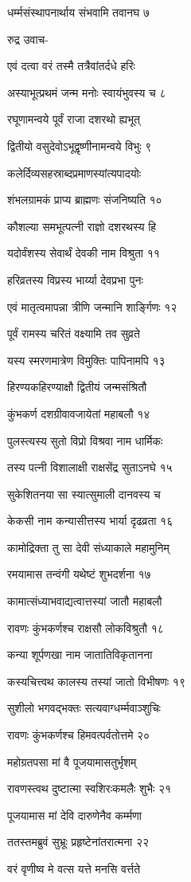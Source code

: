 धर्म्मसंस्थापनार्थाय संभवामि तवानघ ७

रुद्र उवाच-

एवं दत्वा वरं तस्मै तत्रैवांतर्दधे हरिः

अस्याभूत्प्रथमं जन्म मनोः स्वायंभुवस्य च ८

रघूणामन्वये पूर्वं राजा दशरथो ह्यभूत्

द्वितीयो वसुदेवोऽभूद्वृष्णीनामन्वये विभुः ९

कलेर्दिव्यसहस्राब्दप्रमाणस्यांत्यपादयोः

शंभलग्रामकं प्राप्य ब्राह्मणः संजनिष्यति १०

कौशल्या समभूत्पत्नी राज्ञो दशरथस्य हि

यदोर्वंशस्य सेवार्थं देवकी नाम विश्रुता ११

हरिव्रतस्य विप्रस्य भार्य्या देवप्रभा पुनः

एवं मातृत्वमापन्ना त्रीणि जन्मानि शार्ङ्गिणः १२

पूर्वं रामस्य चरितं वक्ष्यामि तव सुव्रते

यस्य स्मरणमात्रेण विमुक्तिः पापिनामपि १३

हिरण्यकहिरण्याक्षौ द्वितीयं जन्मसंश्रितौ

कुंभकर्ण दशग्रीवावजायेतां महाबलौ १४

पुलस्त्यस्य सुतो विप्रो विश्रवा नाम धार्मिकः

तस्य पत्नी विशालाक्षी राक्षसेंद्र सुताऽनघे १५

सुकेशितनया सा स्यात्सुमाली दानवस्य च

केकसी नाम कन्यासीत्तस्य भार्या दृढव्रता १६

कामोद्रिक्ता तु सा देवी संध्याकाले महामुनिम्

रमयामास तन्वंगी यथेष्टं शुभदर्शना १७

कामात्संध्याभवाद्यत्वात्तस्यां जातौ महाबलौ

रावणः कुंभकर्णश्च राक्षसौ लोकविश्रुतौ १८

कन्या शूर्पणखा नाम जातातिविकृतानना

कस्यचित्त्वथ कालस्य तस्यां जातो विभीषणः १९

सुशीलो भगवद्भक्तः सत्यवाग्धर्म्मवाञ्शुचिः

रावणः कुंभकर्णश्च हिमवत्पर्वतोत्तमे २०

महोग्रतपसा मां वै पूजयामासतुर्भृशम्

रावणस्त्वथ दुष्टात्मा स्वशिरःकमलैः शुभैः २१

पूजयामास मां देवि दारुणेनैव कर्म्मणा

ततस्तमब्रुवं सुभ्रूः प्रहृष्टेनांतरात्मना २२

वरं वृणीष्व मे वत्स यत्ते मनसि वर्त्तते

